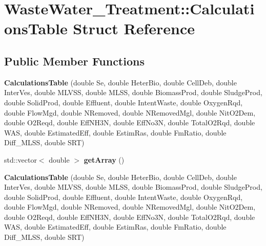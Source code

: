 \hypertarget{struct_waste_water___treatment_1_1_calculations_table}{}\section{Waste\+Water\+\_\+\+Treatment\+:\+:Calculations\+Table Struct Reference}
\label{struct_waste_water___treatment_1_1_calculations_table}
\subsection*{Public Member Functions}
\begin{DoxyCompactItemize}
\item 
\mbox{\label{struct_waste_water___treatment_1_1_calculations_table_a8ddbd7786528c0de36340605a92a8efd}} 
{\bfseries Calculations\+Table} (double Se, double Heter\+Bio, double Cell\+Deb, double Inter\+Ves, double M\+L\+V\+SS, double M\+L\+SS, double Biomass\+Prod, double Sludge\+Prod, double Solid\+Prod, double Effluent, double Intent\+Waste, double Oxygen\+Rqd, double Flow\+Mgd, double N\+Removed, double N\+Removed\+Mgl, double Nit\+O2\+Dem, double O2\+Reqd, double Eff\+N\+H3N, double Eff\+No3N, double Total\+O2\+Rqd, double W\+AS, double Estimated\+Eff, double Estim\+Ras, double Fm\+Ratio, double Diff\+\_\+\+M\+L\+SS, double S\+RT)
\item 
\mbox{\label{struct_waste_water___treatment_1_1_calculations_table_a4d68d7c0ddce2f420de08e751c7efce8}} 
std\+::vector$<$ double $>$ {\bfseries get\+Array} ()
\item 
\mbox{\label{struct_waste_water___treatment_1_1_calculations_table_a8ddbd7786528c0de36340605a92a8efd}} 
{\bfseries Calculations\+Table} (double Se, double Heter\+Bio, double Cell\+Deb, double Inter\+Ves, double M\+L\+V\+SS, double M\+L\+SS, double Biomass\+Prod, double Sludge\+Prod, double Solid\+Prod, double Effluent, double Intent\+Waste, double Oxygen\+Rqd, double Flow\+Mgd, double N\+Removed, double N\+Removed\+Mgl, double Nit\+O2\+Dem, double O2\+Reqd, double Eff\+N\+H3N, double Eff\+No3N, double Total\+O2\+Rqd, double W\+AS, double Estimated\+Eff, double Estim\+Ras, double Fm\+Ratio, double Diff\+\_\+\+M\+L\+SS, double S\+RT)

\end{DoxyCompactItemize}
